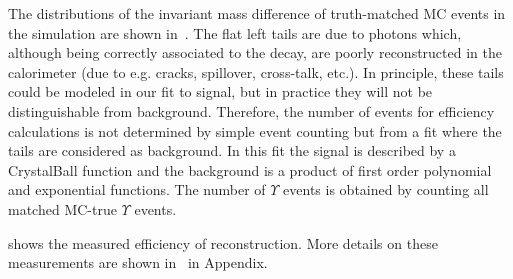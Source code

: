 The distributions of the invariant mass difference of truth-matched MC events in the
\chib simulation are shown in~. The flat left tails 
are due to photons which, although being correctly associated to the \chib decay,
are poorly reconstructed in the calorimeter (due to e.g. cracks, spillover, cross-talk, 
etc.). In principle, these tails could be modeled in our fit to signal, but in
practice they will not be distinguishable from background. Therefore, the
number of \chib events for efficiency calculations is not determined by simple
event counting but from a fit where the tails are considered as background. In
this fit the signal is described by a CrystalBall function and the background is
a product of first order polynomial and exponential functions. The number of $\Upsilon$
events is obtained by counting all matched MC-true $\Upsilon$ events.



 shows the measured efficiency of \chib reconstruction.
More details on these measurements are shown
in~ in Appendix.


